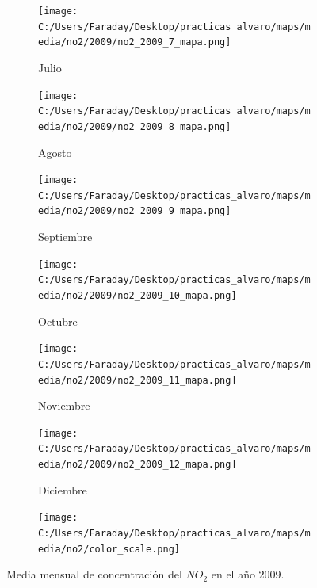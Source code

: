 \documentclass[12pt]{article}
\begin{document}
\begin{figure}[H]
\begin{subfigure}[H]{0.15\textwidth}
\texttt{[image: C:/Users/Faraday/Desktop/practicas\_alvaro/maps/media/no2/2009/no2\_2009\_7\_mapa.png]}
\captionsetup{labelformat=empty}
\caption{Julio}
\label{fig:map-no2-2009-7}
\end{subfigure}
%
\begin{subfigure}[H]{0.15\textwidth}
\texttt{[image: C:/Users/Faraday/Desktop/practicas\_alvaro/maps/media/no2/2009/no2\_2009\_8\_mapa.png]}
\captionsetup{labelformat=empty}
\caption{Agosto}
\label{fig:map-no2-2009-8}
\end{subfigure}
%
\begin{subfigure}[H]{0.15\textwidth}
\texttt{[image: C:/Users/Faraday/Desktop/practicas\_alvaro/maps/media/no2/2009/no2\_2009\_9\_mapa.png]}
\captionsetup{labelformat=empty}
\caption{Septiembre}
\label{fig:map-no2-2009-9}
\end{subfigure}
%
\begin{subfigure}[H]{0.15\textwidth}
\texttt{[image: C:/Users/Faraday/Desktop/practicas\_alvaro/maps/media/no2/2009/no2\_2009\_10\_mapa.png]}
\captionsetup{labelformat=empty}
\caption{Octubre}
\label{fig:map-no2-2009-10}
\end{subfigure}
%
\begin{subfigure}[H]{0.15\textwidth}
\texttt{[image: C:/Users/Faraday/Desktop/practicas\_alvaro/maps/media/no2/2009/no2\_2009\_11\_mapa.png]}
\captionsetup{labelformat=empty}
\caption{Noviembre}
\label{fig:map-no2-2009-11}
\end{subfigure}
%
\begin{subfigure}[H]{0.15\textwidth}
\texttt{[image: C:/Users/Faraday/Desktop/practicas\_alvaro/maps/media/no2/2009/no2\_2009\_12\_mapa.png]}
\captionsetup{labelformat=empty}
\caption{Diciembre}
\label{fig:map-no2-2009-12}
\end{subfigure}

\begin{subfigure}[H]{0.45\textwidth}
\texttt{[image: C:/Users/Faraday/Desktop/practicas\_alvaro/maps/media/no2/color\_scale.png]}
\captionsetup{labelformat=empty}
\caption{}
\end{subfigure}

\vspace*{-7mm}
\caption{Media mensual de concentración del $NO_{2}$ en el año 2009.}
\label{fig:map-no2-2009}
\end{figure}
\end{document}

